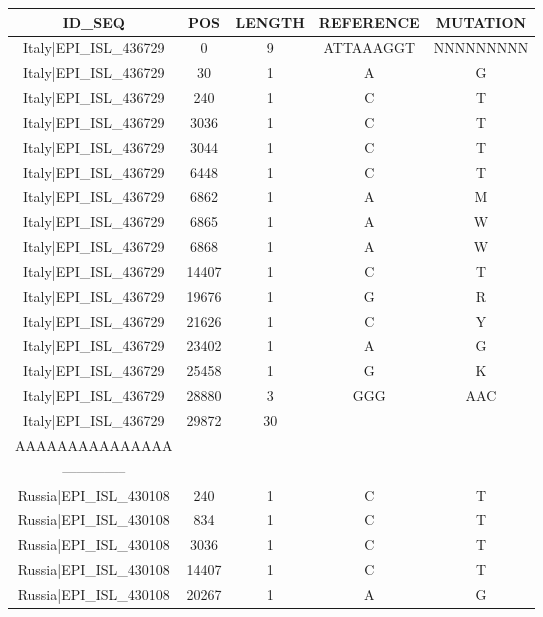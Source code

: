 \documentclass[a4paper,10pt]{article}
\begin{document}
\setlength\LTleft{-1.3 cm}
\begin{longtable}{@{}ccccc@{}}
\toprule
\textbf{ID\_SEQ} & \textbf{POS} & \textbf{LENGTH} & \textbf{REFERENCE} & \textbf{MUTATION} \\* \midrule
\endfirsthead
%
\cline{1-5}
\endhead
%
Italy|EPI\_ISL\_436729 & 0 & 9 & ATTAAAGGT & NNNNNNNNN \\* \midrule
Italy|EPI\_ISL\_436729 & 30 & 1 & A & G \\* \midrule
Italy|EPI\_ISL\_436729 & 240 & 1 & C & T \\* \midrule
Italy|EPI\_ISL\_436729 & 3036 & 1 & C & T \\* \midrule
Italy|EPI\_ISL\_436729 & 3044 & 1 & C & T \\* \midrule
Italy|EPI\_ISL\_436729 & 6448 & 1 & C & T \\* \midrule
Italy|EPI\_ISL\_436729 & 6862 & 1 & A & M \\* \midrule
Italy|EPI\_ISL\_436729 & 6865 & 1 & A & W \\* \midrule
Italy|EPI\_ISL\_436729 & 6868 & 1 & A & W \\* \midrule
Italy|EPI\_ISL\_436729 & 14407 & 1 & C & T \\* \midrule
Italy|EPI\_ISL\_436729 & 19676 & 1 & G & R \\* \midrule
Italy|EPI\_ISL\_436729 & 21626 & 1 & C & Y \\* \midrule
Italy|EPI\_ISL\_436729 & 23402 & 1 & A & G \\* \midrule
Italy|EPI\_ISL\_436729 & 25458 & 1 & G & K \\* \midrule
Italy|EPI\_ISL\_436729 & 28880 & 3 & GGG & AAC \\* \midrule
Italy|EPI\_ISL\_436729 & 29872 & 30 & \begin{tabular}[c]{@{}c@{}}AAAAAAAAAAAAAAA\\ AAAAAAAAAAAAAAA\end{tabular} & \begin{tabular}[c]{@{}c@{}}----------------\\ --------------\end{tabular} \\* \midrule
Russia|EPI\_ISL\_430108 & 240 & 1 & C & T \\* \midrule
Russia|EPI\_ISL\_430108 & 834 & 1 & C & T \\* \midrule
Russia|EPI\_ISL\_430108 & 3036 & 1 & C & T \\* \midrule
Russia|EPI\_ISL\_430108 & 14407 & 1 & C & T \\* \midrule
Russia|EPI\_ISL\_430108 & 20267 & 1 & A & G \\* \midrule

\end{longtable}
\end{document}

